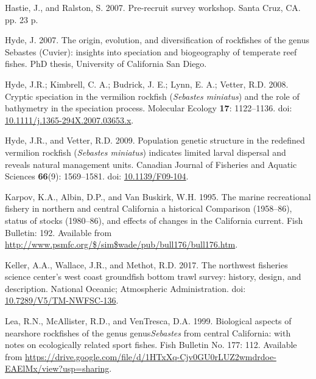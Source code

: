 \documentclass[
  english,
  a4paper,
]{article}
\newlength{\cslhangindent}
\newlength{\cslentryspacingunit} %
\newenvironment{CSLReferences}[2] %
 {%
  \setlength{\parindent}{0pt}
  \ifodd #1
  \let\oldpar\par
  \def\par{\hangindent=\cslhangindent\oldpar}
  \fi
  \setlength{\parskip}{#2\cslentryspacingunit}
 }%
 {}
\begin{document}
\begin{CSLReferences}{1}{0}
\leavevmode{}%
Hastie, J., and Ralston, S. 2007. {Pre-recruit survey workshop}. Santa Cruz, CA. pp. 23 p.

\leavevmode{}%
Hyde, J. 2007. {The origin, evolution, and diversification of rockfishes of the genus Sebastes (Cuvier): insights into speciation and biogeography of temperate reef fishes}. PhD thesis, University of California San Diego.

\leavevmode{}%
Hyde, J.R.; Kimbrell, C. A.; Budrick, J. E.; Lynn, E. A.; Vetter, R.D. 2008. {Cryptic speciation in the vermilion rockfish (\emph{Sebastes miniatus}) and the role of bathymetry in the speciation process}. Molecular Ecology \textbf{17}: 1122--1136. doi: \href{https://doi.org/10.1111/j.1365-294X.2007.03653.x}{10.1111/j.1365-294X.2007.03653.x}.

\leavevmode{}%
Hyde, J.R., and Vetter, R.D. 2009. {Population genetic structure in the redefined vermilion rockfish (\emph{Sebastes miniatus}) indicates limited larval dispersal and reveals natural management units}. Canadian Journal of Fisheries and Aquatic Sciences \textbf{66}(9): 1569--1581. doi: \href{https://doi.org/10.1139/F09-104}{10.1139/F09-104}.

\leavevmode{}%
Karpov, K.A., Albin, D.P., and Van Buskirk, W.H. 1995. {The marine recreational fishery in northern and central California a historical Comparison (1958--86), status of stocks (1980--86), and effects of changes in the California current}. Fish Bulletin: 192. Available from \url{http://www.psmfc.org/$/sim$wade/pub/bull176/bull176.htm}.

\leavevmode{}%
Keller, A.A., Wallace, J.R., and Methot, R.D. 2017. {The northwest fisheries science center's west coast groundfish bottom trawl survey: history, design, and description}. National Oceanic; Atmospheric Administration. doi: \href{https://doi.org/10.7289/V5/TM-NWFSC-136}{10.7289/V5/TM-NWFSC-136}.

\leavevmode{}%
Lea, R.N., McAllister, R.D., and VenTresca, D.A. 1999. {Biological aspects of nearshore rockfishes of the genus genus\emph{Sebastes} from central California: with notes on ecologically related sport fishes}. Fish Bulletin No. 177: 112. Available from \url{https://drive.google.com/file/d/1HTxXq-Cjv0GU0rLUZ2wmdrdoe-EAElMx/view?usp=sharing}.


\end{CSLReferences}
\end{document}

